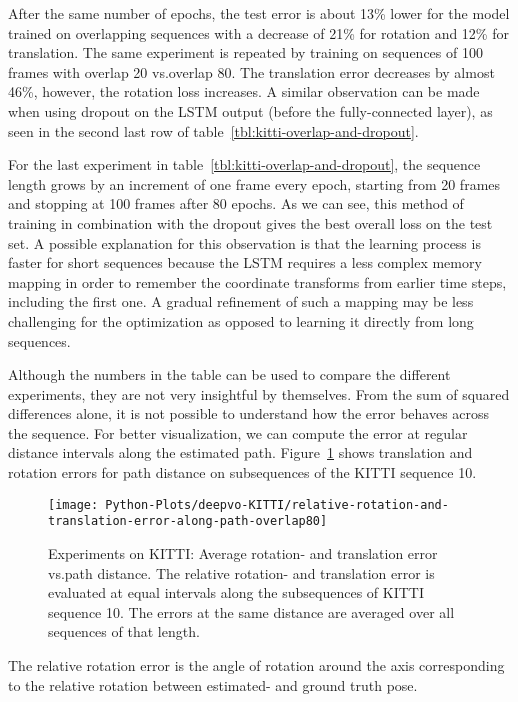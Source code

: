 		After the same number of epochs, the test error is about 13\% lower for the model trained on overlapping sequences with a decrease of 21\% for rotation and 12\% for translation.
		The same experiment is repeated by training on sequences of 100 frames with overlap 20 vs.\@ overlap 80. 
		The translation error decreases by almost 46\%, however, the rotation loss increases.
		A similar observation can be made when using dropout on the LSTM output (before the fully-connected layer), as seen in the second last row of table~\ref{tbl:kitti-overlap-and-dropout}.
		
		For the last experiment in table~\ref{tbl:kitti-overlap-and-dropout}, the sequence length grows by an increment of one frame every epoch, starting from 20 frames and stopping at 100 frames after 80 epochs.
		As we can see, this method of training in combination with the dropout gives the best overall loss on the test set.
		A possible explanation for this observation is that the learning process is faster for short sequences because the LSTM requires a less complex memory mapping in order to remember the coordinate transforms from earlier time steps, including the first one.
		A gradual refinement of such a mapping may be less challenging for the optimization as opposed to learning it directly from long sequences.
		
		Although the numbers in the table can be used to compare the different experiments, they are not very insightful by themselves.
		From the sum of squared differences alone, it is not possible to understand how the error behaves across the sequence.
		For better visualization, we can compute the error at regular distance intervals along the estimated path.
		Figure~\ref{fig:kitti-avg-rotation-translation-error-vs-path-distance} shows translation and rotation errors for path distance on subsequences of the KITTI sequence 10.
		\begin{figure}[t]
			\centering
			\texttt{[image: Python-Plots/deepvo-KITTI/relative-rotation-and-translation-error-along-path-overlap80]}
			\caption[Experiments on KITTI: Average rotation- and translation error vs.\@ path distance]
					{Experiments on KITTI: Average rotation- and translation error vs.\@ path distance.
					 The relative rotation- and translation error is evaluated at equal intervals along the subsequences of KITTI sequence 10.
					 The errors at the same distance are averaged over all sequences of that length.
					 \label{fig:kitti-avg-rotation-translation-error-vs-path-distance}}
		\end{figure}
		The relative rotation error is the angle of rotation around the axis corresponding to the relative rotation between estimated- and ground truth pose.
		

